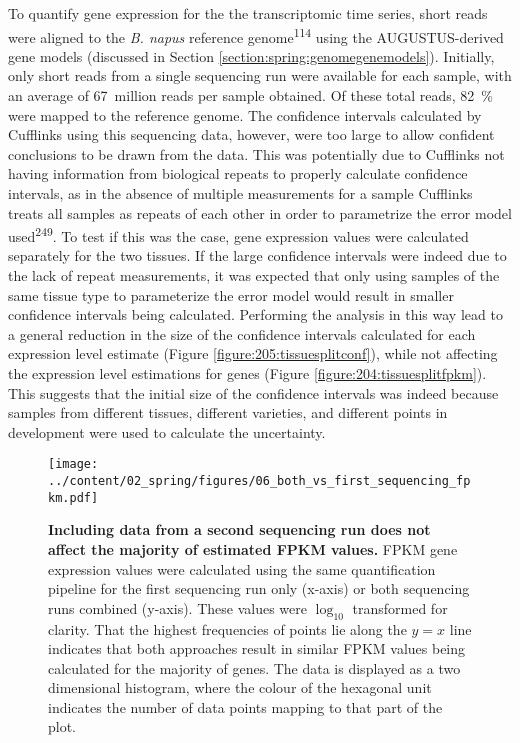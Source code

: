 \documentclass[12pt,]{book}
\begin{document}
To quantify gene expression for the the transcriptomic time series,
short reads were aligned to the \emph{B. napus} reference
genome\textsuperscript{114} using the AUGUSTUS-derived gene models
(discussed in Section \ref{section:spring:genomegenemodels}). Initially,
only short reads from a single sequencing run were available for each
sample, with an average of 67~million reads per sample obtained. Of
these total reads, 82~\% were mapped to the reference genome. The
confidence intervals calculated by Cufflinks using this sequencing data,
however, were too large to allow confident conclusions to be drawn from
the data. This was potentially due to Cufflinks not having information
from biological repeats to properly calculate confidence intervals, as
in the absence of multiple measurements for a sample Cufflinks treats
all samples as repeats of each other in order to parametrize the error
model used\textsuperscript{249}. To test if this was the case, gene
expression values were calculated separately for the two tissues. If the
large confidence intervals were indeed due to the lack of repeat
measurements, it was expected that only using samples of the same tissue
type to parameterize the error model would result in smaller confidence
intervals being calculated. Performing the analysis in this way lead to
a general reduction in the size of the confidence intervals calculated
for each expression level estimate (Figure
\ref{figure:205:tissuesplitconf}), while not affecting the expression
level estimations for genes (Figure \ref{figure:204:tissuesplitfpkm}).
This suggests that the initial size of the confidence intervals was
indeed because samples from different tissues, different varieties, and
different points in development were used to calculate the uncertainty.

\begin{figure}[htbp]
\centering
\texttt{[image: ../content/02\_spring/figures/06\_both\_vs\_first\_sequencing\_fpkm.pdf]}
\caption{\textbf{Including data from a second sequencing run does not
affect the majority of estimated FPKM values.} FPKM gene expression
values were calculated using the same quantification pipeline for the
first sequencing run only (x-axis) or both sequencing runs combined
(y-axis). These values were \(\log_{10}\) transformed for clarity. That
the highest frequencies of points lie along the \(y = x\) line indicates
that both approaches result in similar FPKM values being calculated for
the majority of genes. The data is displayed as a two dimensional
histogram, where the colour of the hexagonal unit indicates the number
of data points mapping to that part of the
plot.}\label{figure:206:repsfpkm}
\end{figure}
\end{document}
